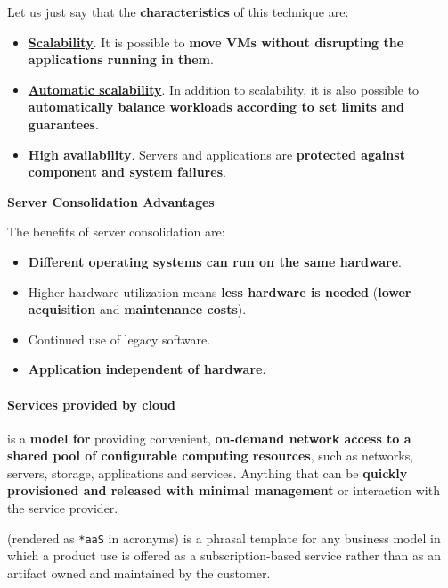 \highspace
Let us just say that the \textbf{characteristics} of this technique are:
\begin{itemize}
	\item \textbf{\underline{Scalability}}. It is possible to \textbf{move VMs without disrupting the applications running in them}.
	
	\item \textbf{\underline{Automatic scalability}}. In addition to scalability, it is also possible to \textbf{automatically balance workloads according to set limits and guarantees}.
	
	\item \textbf{\underline{High availability}}. Servers and applications are \textbf{protected against component and system failures}.
\end{itemize}
\newpage
\begin{flushleft}
	\textcolor{Green3}{ \textbf{Server Consolidation Advantages}}
\end{flushleft}
The benefits of server consolidation are:
\begin{itemize}
	\item \textbf{Different operating systems can run on the same hardware}.
	
	\item Higher hardware utilization means \textbf{less hardware is needed} (\textbf{lower acquisition} and \textbf{maintenance costs}).
	
	\item Continued use of legacy software.
	
	\item \textbf{Application independent of hardware}.
\end{itemize}

\longline

\paragraph{Services provided by cloud}

 is a \textbf{model for} providing convenient, \textbf{on-demand network access to a shared pool of configurable computing resources}, such as networks, servers, storage, applications and services. Anything that can be \textbf{quickly provisioned and released with minimal management} or interaction with the service provider.

\highspace
{} (rendered as \texttt{*aaS} in acronyms) is a phrasal template for any business model in which a product use is offered as a subscription-based service rather than as an artifact owned and maintained by the customer.\cite{bhattacharya2022xaas} 


